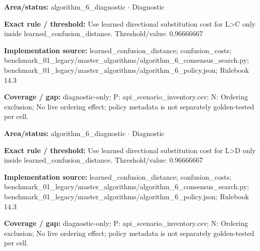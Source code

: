 \begin{tcolorbox}[enhanced,breakable,colback=white,colframe=Muted!45,boxrule=0.45pt,arc=1.5pt,left=6pt,right=6pt,top=5pt,bottom=5pt,title={\texttt{A6-LEARNED-SUBSTITUTION-L-C}},title after break={\texttt{A6-LEARNED-SUBSTITUTION-L-C}\ (continued)},fonttitle=\headingfont\bfseries\color{Navy},coltitle=Navy]
\textbf{Area/status:} algorithm\_\allowbreak{}6\_\allowbreak{}diagnostic $\boldsymbol{\cdot}$ Diagnostic\par
\smallskip
\textbf{Exact rule / threshold:} Use learned directional substitution cost for L>C only inside learned\_\allowbreak{}confusion\_\allowbreak{}distance. Threshold/\allowbreak{}value: 0.96666667\par
\smallskip
\textbf{Implementation source:} learned\_\allowbreak{}confusion\_\allowbreak{}distance; confusion\_\allowbreak{}costs; benchmark\_\allowbreak{}01\_\allowbreak{}legacy/\allowbreak{}master\_\allowbreak{}algorithms/\allowbreak{}algorithm\_\allowbreak{}6\_\allowbreak{}consensus\_\allowbreak{}search.py; benchmark\_\allowbreak{}01\_\allowbreak{}legacy/\allowbreak{}master\_\allowbreak{}algorithms/\allowbreak{}algorithm\_\allowbreak{}6\_\allowbreak{}policy.json; Rulebook 14.3\par
\smallskip
\textbf{Coverage / gap:} diagnostic-only; P: api\_\allowbreak{}scenario\_\allowbreak{}inventory.csv; N: Ordering exclusion; No live ordering effect; policy metadata is not separately golden-tested per cell.
\end{tcolorbox}
\begin{tcolorbox}[enhanced,breakable,colback=white,colframe=Muted!45,boxrule=0.45pt,arc=1.5pt,left=6pt,right=6pt,top=5pt,bottom=5pt,title={\texttt{A6-LEARNED-SUBSTITUTION-L-D}},title after break={\texttt{A6-LEARNED-SUBSTITUTION-L-D}\ (continued)},fonttitle=\headingfont\bfseries\color{Navy},coltitle=Navy]
\textbf{Area/status:} algorithm\_\allowbreak{}6\_\allowbreak{}diagnostic $\boldsymbol{\cdot}$ Diagnostic\par
\smallskip
\textbf{Exact rule / threshold:} Use learned directional substitution cost for L>D only inside learned\_\allowbreak{}confusion\_\allowbreak{}distance. Threshold/\allowbreak{}value: 0.96666667\par
\smallskip
\textbf{Implementation source:} learned\_\allowbreak{}confusion\_\allowbreak{}distance; confusion\_\allowbreak{}costs; benchmark\_\allowbreak{}01\_\allowbreak{}legacy/\allowbreak{}master\_\allowbreak{}algorithms/\allowbreak{}algorithm\_\allowbreak{}6\_\allowbreak{}consensus\_\allowbreak{}search.py; benchmark\_\allowbreak{}01\_\allowbreak{}legacy/\allowbreak{}master\_\allowbreak{}algorithms/\allowbreak{}algorithm\_\allowbreak{}6\_\allowbreak{}policy.json; Rulebook 14.3\par
\smallskip
\textbf{Coverage / gap:} diagnostic-only; P: api\_\allowbreak{}scenario\_\allowbreak{}inventory.csv; N: Ordering exclusion; No live ordering effect; policy metadata is not separately golden-tested per cell.
\end{tcolorbox}
